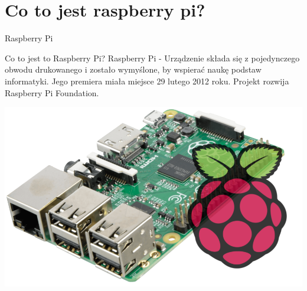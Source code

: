 \section{Co to jest raspberry pi?}
    
    \frame{\sectionpage}
    
    \begin{frame}{Raspberry Pi}
    
        \begin{block}{\centering Co to jest to Raspberry Pi?}
            Raspberry Pi - Urządzenie składa się z pojedynczego obwodu drukowanego i zostało wymyślone, by wspierać naukę podstaw informatyki. Jego premiera miała miejsce 29 lutego 2012 roku. Projekt rozwija Raspberry Pi Foundation.
        \end{block}
        \centering
        \includegraphics[height = 0.5 \textheight]{images/1pi.png}
    \end{frame}
